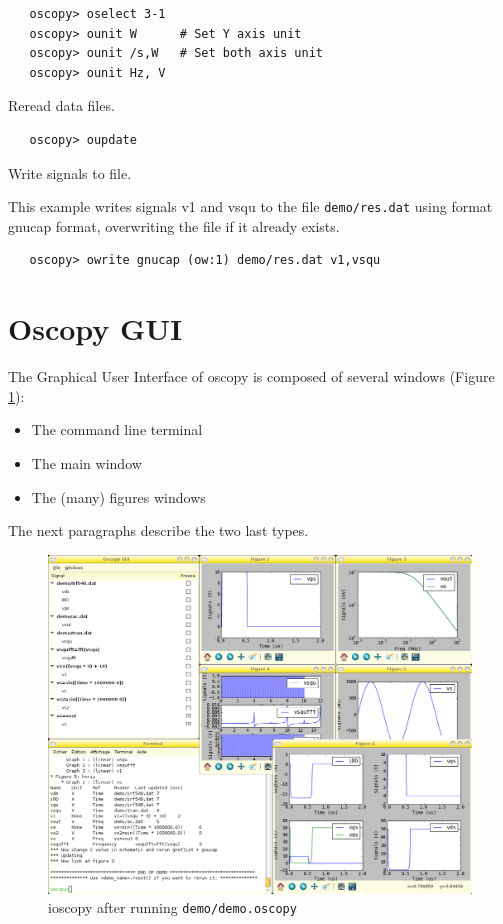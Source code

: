 \documentclass[a4paper,11pt]{article}
\begin{document}
\begin{verbatim}
   oscopy> oselect 3-1
   oscopy> ounit W      # Set Y axis unit
   oscopy> ounit /s,W   # Set both axis unit
   oscopy> ounit Hz, V
\end{verbatim}

   Reread data files.

\begin{verbatim}
   oscopy> oupdate
\end{verbatim}

   Write signals to file.

   This example writes signals v1 and vsqu to the file \texttt{demo/res.dat} using format gnucap format,
   overwriting the file if it already exists.
\begin{verbatim}
   oscopy> owrite gnucap (ow:1) demo/res.dat v1,vsqu
\end{verbatim}
\newpage
\section{Oscopy GUI}
The Graphical User Interface of oscopy is composed of several windows (Figure \ref{fig:screenshot}):
\begin{itemize}
\item The command line terminal
\item The main window
\item The (many) figures windows
\end{itemize}
The next paragraphs describe the two last types.

\begin{figure}[htbp]
  \centering
  \includegraphics[width=.8\textwidth]{../png/ioscopy.png}
  \caption{ioscopy after running \texttt{demo/demo.oscopy}}
  \label{fig:screenshot}
\end{figure}
\end{document}
